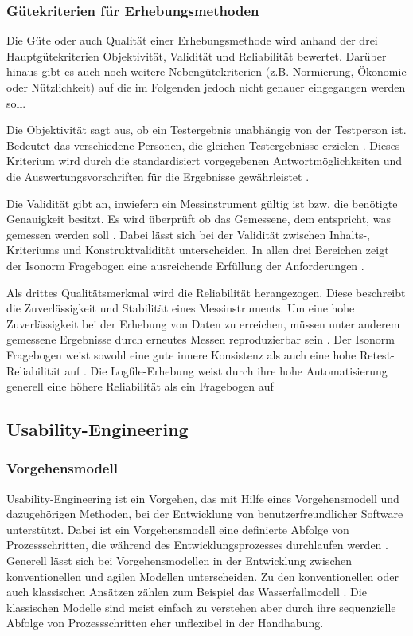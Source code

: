 \subsubsection{Gütekriterien für Erhebungsmethoden}

Die Güte oder auch Qualität einer Erhebungsmethode wird anhand der drei Hauptgütekriterien Objektivität, Validität und Reliabilität bewertet. Darüber hinaus gibt es auch noch weitere Nebengütekriterien (z.B. Normierung, Ökonomie oder Nützlichkeit) \citep[vgl.][Kap. 3.5]{Figl2010} auf die im Folgenden jedoch nicht genauer eingegangen werden soll.

Die Objektivität sagt aus, ob ein Testergebnis unabhängig von der Testperson ist. Bedeutet das verschiedene Personen, die gleichen Testergebnisse erzielen \citep[vgl.][Kap. 1]{Himme2007}. Dieses Kriterium wird durch die standardisiert vorgegebenen Antwortmöglichkeiten und die Auswertungsvorschriften für die Ergebnisse gewährleistet \citep[vgl.][Kap. 3.5.1]{Figl2010}.

Die Validität gibt an, inwiefern ein Messinstrument gültig ist bzw. die benötigte Genauigkeit besitzt. Es wird überprüft ob das Gemessene, dem entspricht, was gemessen werden soll \citep[vgl][Kap. 1]{Himme2007}. Dabei lässt sich bei der Validität zwischen Inhalts-, Kriteriums und Konstruktvalidität unterscheiden. In allen drei Bereichen zeigt der Isonorm Fragebogen eine ausreichende Erfüllung der Anforderungen \citep[vgl.][Kap. 3.5.2]{Figl2010}.

Als drittes Qualitätsmerkmal wird die Reliabilität herangezogen. Diese beschreibt die Zuverlässigkeit und Stabilität eines Messinstruments. Um eine hohe Zuverlässigkeit bei der Erhebung von Daten zu erreichen, müssen unter anderem gemessene Ergebnisse durch erneutes Messen reproduzierbar sein \citep[vgl.][Kap. 1]{Himme2007}. Der Isonorm Fragebogen weist sowohl eine gute innere Konsistenz als auch eine hohe Retest-Reliabilität auf \citep[vgl.][Kap. 3.5.3]{Figl2010}. Die Logfile-Erhebung weist durch ihre hohe Automatisierung generell eine höhere Reliabilität als ein Fragebogen auf \citep[vgl.][Kap. 65.3]{Baur2014}

\subsection{Usability-Engineering}
\subsubsection{Vorgehensmodell}
Usability-Engineering ist ein Vorgehen, das mit Hilfe eines Vorgehensmodell und dazugehörigen Methoden, bei der Entwicklung von benutzerfreundlicher Software unterstützt. Dabei ist ein Vorgehensmodell eine definierte Abfolge von Prozessschritten, die während des Entwicklungsprozesses durchlaufen werden \citep[vgl.][7]{Richter2013}. Generell lässt sich bei Vorgehensmodellen in der Entwicklung zwischen konventionellen und agilen Modellen unterscheiden. Zu den konventionellen oder auch klassischen Ansätzen zählen zum Beispiel das Wasserfallmodell \citep[vgl.][27\psqq]{Brandt2008}. Die klassischen Modelle sind meist einfach zu verstehen aber durch ihre sequenzielle Abfolge von Prozessschritten eher unflexibel in der Handhabung.

